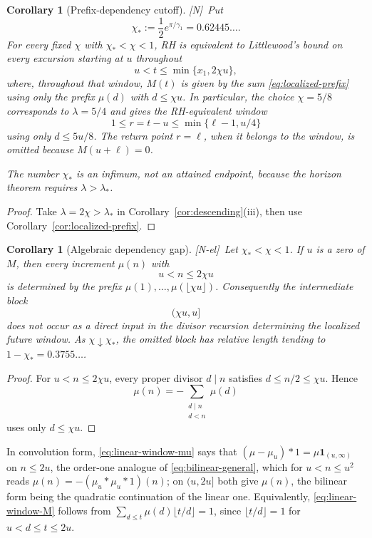 \documentclass[11pt]{amsart}
\numberwithin{equation}{section}
\theoremstyle{plain}
\newtheorem{corollary}[theorem]{Corollary}
\theoremstyle{definition}
\theoremstyle{remark}
\newcommand{\tagN}{\textup{[N]}}
\newcommand{\tagNE}{\textup{[N-el]}}
\begin{document}
\begin{corollary}[Prefix-dependency cutoff]
\label{cor:prefix-cutoff}
\tagN\ Put
\[
\chi_*:=\frac12e^{\pi/\gamma_1}=0.62445\ldots .
\]
For every fixed $\chi$ with $\chi_*<\chi<1$, RH is equivalent to
Littlewood's bound on every excursion starting at $u$ throughout
\[
u<t\le\min\{x_1,2\chi u\},
\]
where, throughout that window, $M(t)$ is given by the sum
\eqref{eq:localized-prefix} using only the prefix
$\mu(d)$ with $d\le\chi u$.  In particular, the choice
$\chi=5/8$ corresponds to $\lambda=5/4$ and gives the RH-equivalent
window
\[
1\le r=t-u\le\min\{\ell-1,u/4\}
\]
using only $d\le5u/8$. The return point $r=\ell$, when it belongs to the
window, is omitted because $M(u+\ell)=0$.

The number $\chi_*$ is an infimum, not an attained endpoint, because the
horizon theorem requires $\lambda>\lambda_*$.
\end{corollary}

\begin{proof}
Take $\lambda=2\chi>\lambda_*$ in
Corollary~\ref{cor:descending}(iii), then use
Corollary~\ref{cor:localized-prefix}.
\end{proof}


\begin{corollary}[Algebraic dependency gap]
\label{cor:dependency-gap}
\tagNE\ Let $\chi_*<\chi<1$.  If $u$ is a zero of $M$, then every increment
$\mu(n)$ with
\[
u<n\le2\chi u
\]
is determined by the prefix
$\mu(1),\ldots,\mu(\lfloor\chi u\rfloor)$.  Consequently the intermediate
block
\[
(\chi u,u]
\]
does not occur as a direct input in the divisor recursion determining the
localized future window.  As $\chi\downarrow\chi_*$, the omitted block
has relative length tending to
$1-\chi_*=0.3755\ldots$.
\end{corollary}

\begin{proof}
For $u<n\le2\chi u$, every proper divisor $d\mid n$ satisfies
$d\le n/2\le\chi u$.  Hence
\[
\mu(n)=-\sum_{\substack{d\mid n\\ d<n}}\mu(d)
\]
uses only $d\le\chi u$.
\end{proof}

In convolution form, \eqref{eq:linear-window-mu} says that
$(\mu-\mu_u)*1=\mu\mathbf 1_{(u,\infty)}$ on $n\le2u$, the order-one analogue
of \eqref{eq:bilinear-general}, which for $u<n\le u^2$ reads
$\mu(n)=-(\mu_u*\mu_u*1)(n)$; on $(u,2u]$ both give $\mu(n)$, the
bilinear form being the quadratic continuation of the linear one. Equivalently, \eqref{eq:linear-window-M}
follows from $\sum_{d\le t}\mu(d)\lfloor t/d\rfloor=1$, since
$\lfloor t/d\rfloor=1$ for $u<d\le t\le2u$.
\end{document}

